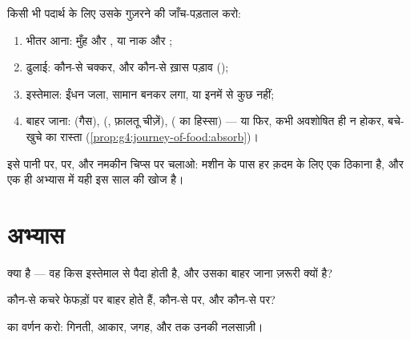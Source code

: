 \begin{method}[पूरे शरीर की जाँच-पड़ताल]\label{met:g7:removing-wastes:audit}
किसी भी पदार्थ के लिए उसके गुज़रने की जाँच-पड़ताल करो:
\begin{enumerate}
  \item भीतर आना: मुँह और , या नाक और ;
  \item ढुलाई: कौन-से चक्कर, और कौन-से ख़ास पड़ाव
        ();
  \item इस्तेमाल: ईंधन जला, सामान बनकर लगा, या इनमें से कुछ नहीं;
  \item बाहर जाना:  (गैस),  (, फ़ालतू चीज़ें),
         ( का हिस्सा) --- या फिर, कभी अवशोषित ही न होकर,
        बचे-खुचे का रास्ता
        (\cref{prop:g4:journey-of-food:absorb})।
\end{enumerate}
इसे पानी पर,  पर, और नमकीन चिप्स पर चलाओ: मशीन के पास हर क़दम
के लिए एक ठिकाना है, और एक ही अभ्यास में यही इस साल की खोज है।
\end{method}

\section{अभ्यास}

\begin{exercise}[$\star$]\label{exo:g7:removing-wastes:1}
 क्या है --- वह किस इस्तेमाल से पैदा होती है, और उसका बाहर जाना
ज़रूरी क्यों है?
\end{exercise}

\begin{exercise}[$\star$]\label{exo:g7:removing-wastes:2}
कौन-से कचरे फेफड़ों पर बाहर होते हैं, कौन-से  पर, और कौन-से
 पर?
\end{exercise}

\begin{exercise}[$\star$]\label{exo:g7:removing-wastes:3}
 का वर्णन करो: गिनती, आकार, जगह, और  तक उनकी नलसाज़ी।
\end{exercise}

